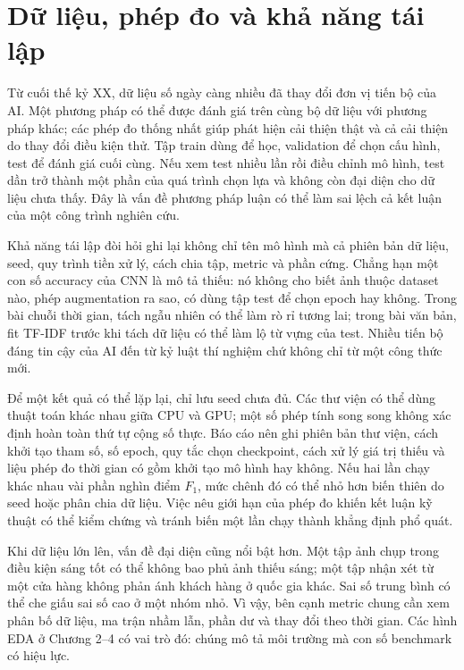 \documentclass[12pt,a4paper]{report}
\begin{document}
\section{Dữ liệu, phép đo và khả năng tái lập}
Từ cuối thế kỷ XX, dữ liệu số ngày càng nhiều đã thay đổi đơn vị tiến bộ của AI. Một phương pháp có thể được đánh giá trên cùng bộ dữ liệu với phương pháp khác; các phép đo thống nhất giúp phát hiện cải thiện thật và cả cải thiện do thay đổi điều kiện thử. Tập train dùng để học, validation để chọn cấu hình, test để đánh giá cuối cùng. Nếu xem test nhiều lần rồi điều chỉnh mô hình, test dần trở thành một phần của quá trình chọn lựa và không còn đại diện cho dữ liệu chưa thấy. Đây là vấn đề phương pháp luận có thể làm sai lệch cả kết luận của một công trình nghiên cứu.

Khả năng tái lập đòi hỏi ghi lại không chỉ tên mô hình mà cả phiên bản dữ liệu, seed, quy trình tiền xử lý, cách chia tập, metric và phần cứng. Chẳng hạn một con số accuracy của CNN là mô tả thiếu: nó không cho biết ảnh thuộc dataset nào, phép augmentation ra sao, có dùng tập test để chọn epoch hay không. Trong bài chuỗi thời gian, tách ngẫu nhiên có thể làm rò rỉ tương lai; trong bài văn bản, fit TF-IDF trước khi tách dữ liệu có thể làm lộ từ vựng của test. Nhiều tiến bộ đáng tin cậy của AI đến từ kỷ luật thí nghiệm chứ không chỉ từ một công thức mới.

Để một kết quả có thể lặp lại, chỉ lưu seed chưa đủ. Các thư viện có thể dùng thuật toán khác nhau giữa CPU và GPU; một số phép tính song song không xác định hoàn toàn thứ tự cộng số thực. Báo cáo nên ghi phiên bản thư viện, cách khởi tạo tham số, số epoch, quy tắc chọn checkpoint, cách xử lý giá trị thiếu và liệu phép đo thời gian có gồm khởi tạo mô hình hay không. Nếu hai lần chạy khác nhau vài phần nghìn điểm $F_1$, mức chênh đó có thể nhỏ hơn biến thiên do seed hoặc phân chia dữ liệu. Việc nêu giới hạn của phép đo khiến kết luận kỹ thuật có thể kiểm chứng và tránh biến một lần chạy thành khẳng định phổ quát.

Khi dữ liệu lớn lên, vấn đề đại diện cũng nổi bật hơn. Một tập ảnh chụp trong điều kiện sáng tốt có thể không bao phủ ảnh thiếu sáng; một tập nhận xét từ một cửa hàng không phản ánh khách hàng ở quốc gia khác. Sai số trung bình có thể che giấu sai số cao ở một nhóm nhỏ. Vì vậy, bên cạnh metric chung cần xem phân bố dữ liệu, ma trận nhầm lẫn, phần dư và thay đổi theo thời gian. Các hình EDA ở Chương 2--4 có vai trò đó: chúng mô tả môi trường mà con số benchmark có hiệu lực.
\end{document}
